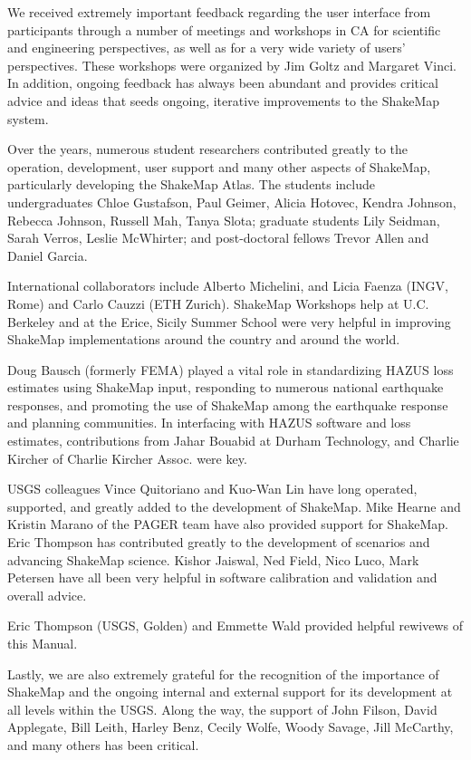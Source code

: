 \documentclass[letterpaper,10pt,english]{sphinxmanual}
\begin{document}
We received extremely important feedback regarding the user interface from
participants through a number of meetings and workshops in CA for
scientific and engineering perspectives, as well as for a very wide variety of
users’ perspectives. These workshops were organized by Jim Goltz and Margaret
Vinci. In addition, ongoing feedback has always been abundant and provides
critical advice and ideas that seeds ongoing, iterative improvements to the
ShakeMap system.

Over the years, numerous student researchers contributed greatly to the operation,
development, user support and many other aspects of ShakeMap, particularly
developing the ShakeMap Atlas. The students include undergraduates Chloe Gustafson,
Paul Geimer, Alicia Hotovec, Kendra Johnson, Rebecca Johnson, Russell Mah, Tanya Slota;
graduate students Lily Seidman, Sarah Verros, Leslie McWhirter;
and post-doctoral fellows Trevor Allen and Daniel Garcia.

International collaborators include Alberto Michelini, and Licia Faenza (INGV,
Rome) and Carlo Cauzzi (ETH Zurich). ShakeMap Workshops help at U.C. Berkeley
and at the Erice, Sicily Summer School were very helpful in improving ShakeMap
implementations around the country and around the world.

Doug Bausch (formerly FEMA) played a vital role in standardizing HAZUS loss
estimates using ShakeMap input, responding to numerous national earthquake
responses, and promoting the use of ShakeMap among the earthquake
response and planning communities. In interfacing with HAZUS software
and loss estimates, contributions from Jahar Bouabid at
Durham Technology, and Charlie Kircher of Charlie Kircher Assoc. were key.

USGS colleagues Vince Quitoriano and Kuo-Wan Lin have long operated,
supported, and greatly added to the development of ShakeMap. Mike Hearne and
Kristin Marano of the PAGER team have also provided support for ShakeMap. Eric Thompson
has contributed greatly to the development of scenarios and advancing ShakeMap
science. Kishor Jaiswal, Ned Field, Nico Luco, Mark Petersen have all been very helpful
in software calibration and validation and overall advice.

Eric Thompson (USGS, Golden) and Emmette Wald provided helpful rewivews of this Manual.

Lastly, we are also extremely grateful for the recognition of the
importance of ShakeMap and the ongoing internal and external support for its
development at all levels within the USGS. Along the way, the support of
John Filson, David Applegate, Bill Leith, Harley Benz, Cecily Wolfe, Woody Savage, Jill
McCarthy, and many others has been critical.
\end{document}

